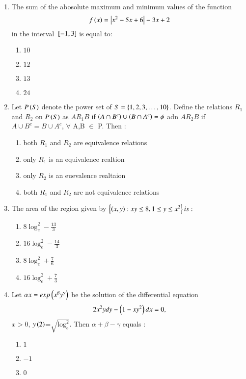 \documentclass[journal]{IEEEtran}
\begin{document}
\begin{enumerate}
	\item The sum of the abosolute maximum and minimum values of the function 
             \begin{align*}
		f\left(x\right) =\left\vert x^2-5x+6\right\vert-3x+2
             \end{align*}
		in the interval ${}\left[-1,3\right]$ is equal to:
		\begin{enumerate}
			\item $10$
			\item $12$
			\item $13$
			\item $24$
        	\end{enumerate}	
	\item Let $P\left(S\right)$ denote the power set of $S =\left\{1,2,3,\ldots,10\right\}$. Define the relations $R_1$ and $R_2$ on $P\left(S\right)$ as $AR_1B$ if $\left(A \cap B^c\right)\cup \left(B\cap A^c\right)=\phi$ adn $AR_2B$ if $A\cup B^c=B\cup A^c$, $\forall$ A,B $\in$ P. Then :
		\begin{enumerate}
			\item both $R_1$ and $R_2$ are equivalence relations
			\item only $R_1$ is an equivalence realtion
			\item only $R_2$ is an euevalence realtaion
			\item both $R_1$ and $R_2$ are not equivalence relations
        	\end{enumerate}	
	\item The area of the region given by $\left\{\left(x,y\right):xy \leq 8, 1 \leq y \leq x^2 \right\} is :$
		\begin{enumerate}
			\item $8 \log^{2}_e-\frac{13}{3}$
			\item $16 \log^{2}_e-\frac{14}{3}$
			\item $8 \log^{2}_e+\frac{7}{6}$
			\item $16 \log^{2}_e+\frac{7}{3}$
        	\end{enumerate}	
	\item Let $\alpha x=exp\left(x^\beta y^\gamma\right)$ be the solution of the differential equation 
             \begin{align*}
		2x^2ydy-\left(1-xy^2\right)dx=0,
             \end{align*}
	 $x>0$, $y\left(2\right)$=$\sqrt{\log_e^2}$. Then $\alpha + \beta - \gamma$ equals :
		\begin{enumerate}
			\item $1$
			\item $-1$
			\item $0$

\end{enumerate}
\end{enumerate}
\end{document}
